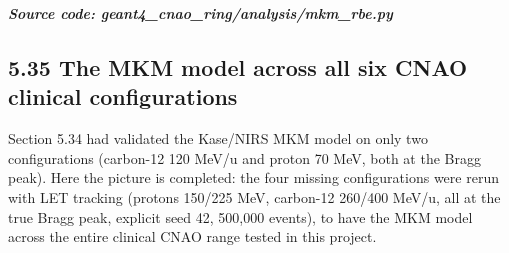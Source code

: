 \documentclass[
  english,
]{article}
\begin{document}
\textit{\textbf{Source code: geant4\_\allowbreak{}cnao\_\allowbreak{}ring/analysis/mkm\_\allowbreak{}rbe.py}}


\subsection{5.35 The MKM model across all six CNAO clinical configurations}\label{the-mkm-model-across-all-six-cnao-clinical-configurations}

Section 5.34 had validated the Kase/NIRS MKM model on only two configurations (carbon-12 120 MeV/u and proton 70 MeV, both at the Bragg peak). Here the picture is completed: the four missing configurations were rerun with LET tracking (protons 150/225 MeV, carbon-12 260/400 MeV/u, all at the true Bragg peak, explicit seed 42, 500,000 events), to have the MKM model across the entire clinical CNAO range tested in this project.
\end{document}
